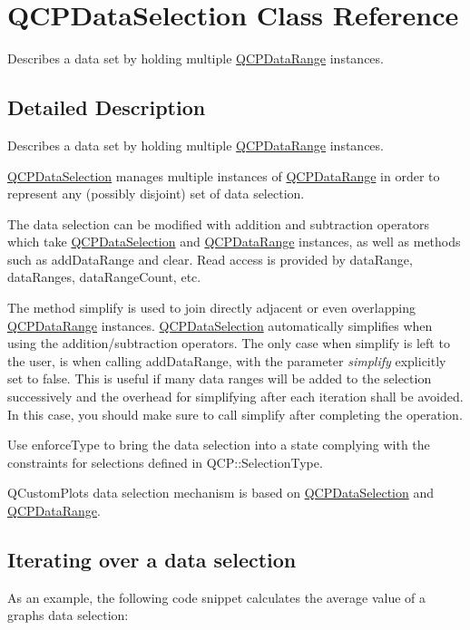 \hypertarget{class_q_c_p_data_selection}{}\section{Q\+C\+P\+Data\+Selection Class Reference}
\label{class_q_c_p_data_selection}


Describes a data set by holding multiple \mbox{\hyperlink{class_q_c_p_data_range}{Q\+C\+P\+Data\+Range}} instances.  




\subsection{Detailed Description}
Describes a data set by holding multiple \mbox{\hyperlink{class_q_c_p_data_range}{Q\+C\+P\+Data\+Range}} instances. 

\mbox{\hyperlink{class_q_c_p_data_selection}{Q\+C\+P\+Data\+Selection}} manages multiple instances of \mbox{\hyperlink{class_q_c_p_data_range}{Q\+C\+P\+Data\+Range}} in order to represent any (possibly disjoint) set of data selection.

The data selection can be modified with addition and subtraction operators which take \mbox{\hyperlink{class_q_c_p_data_selection}{Q\+C\+P\+Data\+Selection}} and \mbox{\hyperlink{class_q_c_p_data_range}{Q\+C\+P\+Data\+Range}} instances, as well as methods such as add\+Data\+Range and clear. Read access is provided by data\+Range, data\+Ranges, data\+Range\+Count, etc.

The method simplify is used to join directly adjacent or even overlapping \mbox{\hyperlink{class_q_c_p_data_range}{Q\+C\+P\+Data\+Range}} instances. \mbox{\hyperlink{class_q_c_p_data_selection}{Q\+C\+P\+Data\+Selection}} automatically simplifies when using the addition/subtraction operators. The only case when simplify is left to the user, is when calling add\+Data\+Range, with the parameter {\itshape simplify} explicitly set to false. This is useful if many data ranges will be added to the selection successively and the overhead for simplifying after each iteration shall be avoided. In this case, you should make sure to call simplify after completing the operation.

Use enforce\+Type to bring the data selection into a state complying with the constraints for selections defined in Q\+C\+P\+::\+Selection\+Type.

Q\+Custom\+Plot\textquotesingle{}s data selection mechanism is based on \mbox{\hyperlink{class_q_c_p_data_selection}{Q\+C\+P\+Data\+Selection}} and \mbox{\hyperlink{class_q_c_p_data_range}{Q\+C\+P\+Data\+Range}}.\hypertarget{class_q_c_p_data_selection_qcpdataselection-iterating}{}\subsection{Iterating over a data selection}\label{class_q_c_p_data_selection_qcpdataselection-iterating}
As an example, the following code snippet calculates the average value of a graph\textquotesingle{}s data selection\+:


